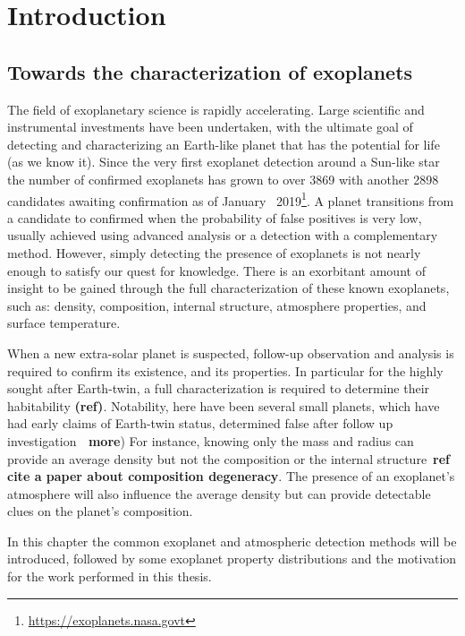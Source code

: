 
\chapter{Introduction}\label{cha:introduction}

\section{Towards the characterization of exoplanets}

The field of exoplanetary science is rapidly accelerating. Large scientific and instrumental investments have been undertaken, with the ultimate goal of detecting and characterizing an Earth-like planet that has the potential for life (as we know it).
Since the very first exoplanet detection around a Sun-like star~\citep{mayor_jupitermass_1995} the number of confirmed exoplanets has grown to over 3869 with another 2898 candidates awaiting confirmation as of January~ 2019\footnote{\href{https://exoplanets.nasa.gov/}{https://exoplanets.nasa.govt}}. A planet transitions from a candidate to confirmed when the probability of false positives is very low, usually achieved using advanced analysis or a detection with a complementary method.
However, simply detecting the presence of exoplanets is not nearly enough to satisfy our quest for knowledge.
There is an exorbitant amount of insight to be gained through the full characterization of these known exoplanets, such as: density, composition, internal structure, atmosphere properties, and surface temperature.

When a new extra-solar planet is suspected, follow-up observation and analysis is required to confirm its existence, and its properties.
In particular for the highly sought after Earth-twin, a full characterization is required to determine their habitability \textbf{(ref)}.\todo{}
Notability, here have been several small planets, which have had early claims of Earth-twin status, determined false after follow up investigation\textbf{~\citep[e.g.][]{mullally_kepler_2018} \textbf{more}})
For instance, knowing only the mass and radius can provide an average density but not the composition or the internal structure~\textbf{ref cite {a paper about composition degeneracy}}. \todo{}
The presence of an exoplanet's atmosphere will also influence the average density but can provide detectable clues on the planet's composition.

In this chapter the common exoplanet and atmospheric detection methods will be introduced, followed by some exoplanet property distributions and the motivation for the work performed in this thesis.\\












